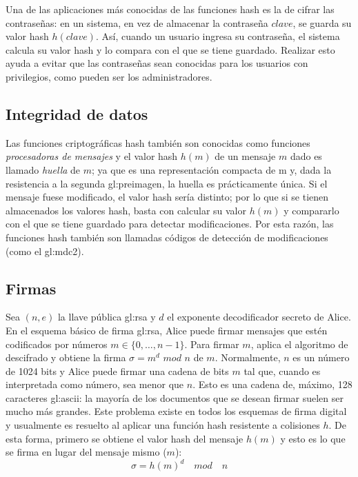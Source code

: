Una de las aplicaciones más conocidas de las funciones hash es la de
cifrar las contraseñas: en un sistema, en vez de almacenar la contraseña
$clave$, se guarda su valor hash $h(clave)$. Así, cuando un usuario
ingresa su contraseña, el sistema calcula su valor hash y lo compara con
el que se tiene guardado. Realizar esto ayuda a evitar que las
contraseñas sean conocidas para los usuarios con privilegios, como
pueden ser los administradores.

\subsection{Integridad de datos}

Las funciones criptográficas hash también son conocidas como funciones
\textit{procesadoras de mensajes} y el valor hash $h(m)$ de un mensaje
$m$ dado es llamado \textit{huella} de $m$; ya que es una representación
compacta de m y, dada la resistencia a la segunda \gls{gl:preimagen}, la huella
es prácticamente única. Si el mensaje fuese modificado, el valor hash
sería distinto; por lo que si se tienen almacenados los valores hash,
basta con calcular su valor $h(m)$ y compararlo con el que se tiene
guardado para detectar modificaciones. Por esta razón, las funciones
hash también son llamadas códigos de detección de modificaciones (como el
\gls{gl:mdc2}).

\subsection{Firmas}

Sea $(n, e)$ la llave pública \gls{gl:rsa} y $d$ el exponente decodificador
secreto de Alice. En el esquema básico de firma \gls{gl:rsa}, Alice puede
firmar mensajes que estén codificados por números $ m \in \{0, \dots, n-1\}$.
Para firmar $m$, aplica el algoritmo de descifrado y obtiene la firma
$\sigma = m^d$ $mod$ $n$ de $m$.
Normalmente, $n$ es un número de 1024 bits y Alice puede firmar una
cadena de bits $m$ tal que, cuando es interpretada como número, sea
menor que $n$. Esto es una cadena de, máximo, 128 caracteres
\gls{gl:ascii}: la mayoría de los documentos que se desean firmar suelen
ser mucho más grandes. Este problema existe en todos los esquemas de firma
digital y usualmente es resuelto al aplicar una función hash resistente a
colisiones $h$. De esta forma, primero se obtiene el valor hash del mensaje
$h(m)$ y esto es lo que se firma en lugar del mensaje mismo ($m$):
\begin{equation}
  \label{funcion_hash_sign}
  \sigma = h(m)^d \quad mod \quad n
\end{equation}

